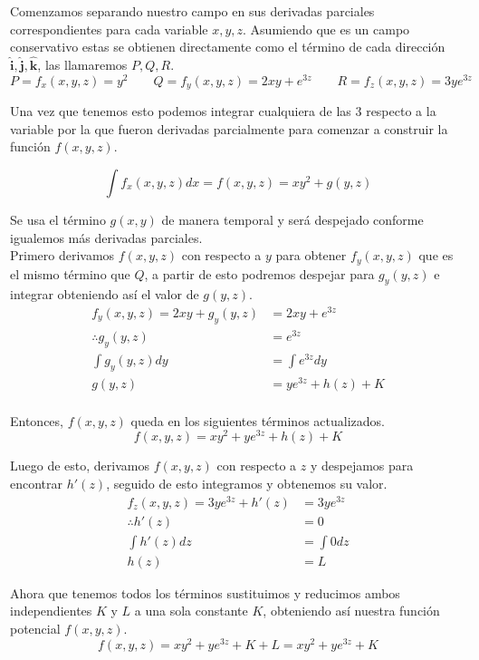 \documentclass{article}
\begin{document}
Comenzamos separando nuestro campo en sus derivadas parciales correspondientes para cada variable $x,y,z$. 
Asumiendo que es un campo conservativo estas se obtienen directamente como el término de cada dirección 
$\pmb{\hat{i}},\pmb{\hat{j}},\pmb{\hat{k}}$, las llamaremos $P,Q,R$.
\begin{equation*}
    P=f_{x}(x,y,z)=y^2 \qquad Q=f_{y}(x,y,z)=2xy+e^{3z} \qquad R=f_{z}(x,y,z)=3ye^{3z}
\end{equation*}

Una vez que tenemos esto podemos integrar cualquiera de las 3 respecto a la variable por la que fueron 
derivadas parcialmente para comenzar a construir la función $f(x,y,z)$.

\begin{equation*}
    \int f_{x}(x,y,z)dx=f(x,y,z)=xy^2+g(y,z)
\end{equation*}

Se usa el término $g(x,y)$ de manera temporal y será despejado conforme igualemos más derivadas parciales.\\

Primero derivamos $f(x,y,z)$ con respecto a $y$ para obtener $f_{y}(x,y,z)$ que es el mismo término que $Q$, a partir de esto
podremos despejar para $g_{y}(y,z)$ e integrar obteniendo así el valor de $g(y,z)$.
\begin{equation*}
    \begin{split}
        f_{y}(x,y,z)=2xy+g_{y}(y,z)&=2xy+e^{3z} \\
        \therefore g_{y}(y,z)&=e^{3z} \\
        \int g_{y}(y,z)dy&=\int e^{3z}dy\\
        g(y,z)&=ye^{3z}+h(z)+K\\
    \end{split}
\end{equation*}

Entonces, $f(x,y,z)$ queda en los siguientes términos actualizados.
\begin{equation*}
    f(x,y,z)=xy^2+ye^{3z}+h(z)+K
\end{equation*}

Luego de esto, derivamos $f(x,y,z)$ con respecto a $z$ y despejamos para encontrar $h'(z)$, seguido de esto integramos y obtenemos su valor.
\begin{equation*}
    \begin{split}
        f_{z}(x,y,z)=3ye^{3z}+h'(z)&=3ye^{3z}\\
        \therefore h'(z)&=0\\
        \int h'(z)dz&=\int 0dz\\
        h(z)&=L
    \end{split}
\end{equation*}

Ahora que tenemos todos los términos sustituimos y reducimos ambos independientes $K$ y $L$ a una sola constante $K$, obteniendo así nuestra función potencial $f(x,y,z)$.
\begin{equation*}
    f(x,y,z)=xy^2+ye^{3z}+K+L=xy^2+ye^{3z}+K
\end{equation*}
\end{document}
